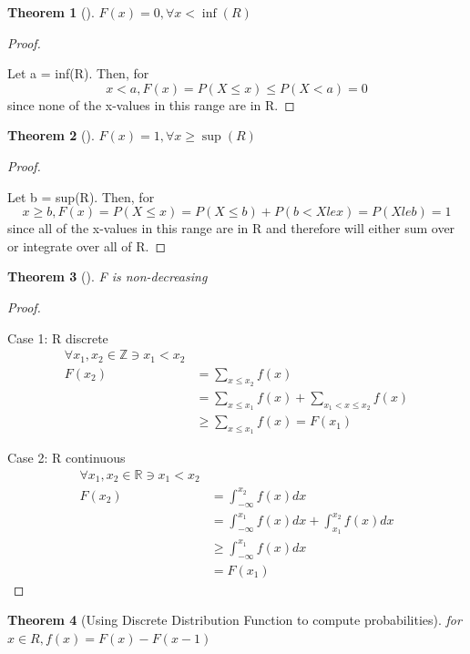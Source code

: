 \documentclass[10pt,]{book}
\theoremstyle{plain}
\newtheorem{theorem}{Theorem}[section]
\theoremstyle{definition}
\theoremstyle{definition}
\theoremstyle{definition}
\numberwithin{equation}{section}
\newcommand{\lt}{ < }
\begin{document}
\begin{theorem}[{}]\label{theorem-Fmin}
\(F(x)=0, \forall x \lt \inf(R)\)\end{theorem}
\begin{proof}\hypertarget{proof-21}{}

		Let a = inf(R). Then, for 
		\begin{equation*}x \lt a, F(x) = P(X \le x) \le P(X \lt a) = 0\end{equation*} 
		since none of the x-values in this range are in R.
\end{proof}
\begin{theorem}[{}]\label{theorem-Fmax}
\(F(x)=1, \forall x \ge \sup(R)\)\end{theorem}
\begin{proof}\hypertarget{proof-22}{}

		Let b = sup(R). Then, for 
		\begin{equation*}x \ge b, F(x) = P(X \le x)  = P(X \le b) + P( b \lt X le x) = P(X le b) = 1\end{equation*} 
		since all of the x-values in this range are in R and therefore will either sum over or integrate over all of R.
\end{proof}
\begin{theorem}[{}]\label{theorem-22}
F is non-decreasing\end{theorem}
\begin{proof}\hypertarget{proof-23}{}
Case 1: R discrete%
\begin{align*}
\forall x_1,x_2 \in \mathbb{Z} \ni x_1 \lt x_2\\
F(x_2) & = \sum_{x \le x_2} f(x) \\
& = \sum_{x \le x_1} f(x) + \sum_{x_1 \lt x \le x_2} f(x)\\
& \ge \sum_{x \le x_1} f(x) = F(x_1)
\end{align*}\par
Case 2: R continuous%
\begin{align*}
\forall x_1,x_2 \in \mathbb{R} \ni x_1 \lt x_2\\
F(x_2) & = \int_{-\infty}^{x_2} f(x) dx \\
 & = \int_{-\infty}^{x_1} f(x) dx + \int_{x_1}^{x_2} f(x) dx\\
 & \ge \int_{-\infty}^{x_1} f(x) dx\\
 & = F(x_1)
\end{align*}\end{proof}
\begin{theorem}[{Using Discrete Distribution Function to compute probabilities}]\label{theorem-Fvsf-discrete}
for \(x \in R, f(x) = F(x) - F(x-1)\)\end{theorem}
\end{document}
